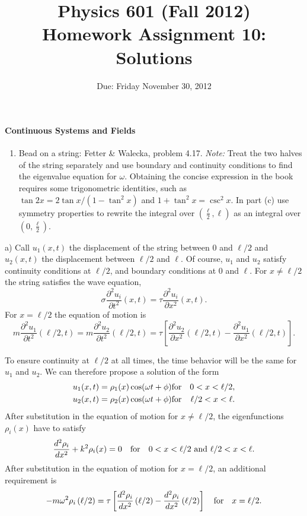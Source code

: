 \documentclass[letterpaper,11pt]{article}
\title{Physics 601 (Fall 2012) \\ Homework Assignment 10: Solutions}
\date{Due: Friday November 30, 2012}
\begin{document}
\maketitle

\paragraph*{Continuous Systems and Fields}
\begin{enumerate}[resume]
 \item Bead on a string: Fetter \& Walecka, problem 4.17. \emph{Note:} Treat the two halves of the string separately and use boundary and continuity conditions to find the eigenvalue equation for $\omega$.  Obtaining the concise expression in the book requires some trigonometric identities, such as $\tan 2x = 2 \tan x / (1-\tan^2 x)$ and $1 + \tan^2 x = \csc^2 x$.  In part (c) use symmetry properties to rewrite the integral over $(\frac{\ell}{2},\ell)$ as an integral over $(0,\frac{\ell}{2})$.
\end{enumerate}
a) Call $u_1(x,t)$ the displacement of the string between $0$ and $\ell/2$ and $u_2(x,t)$ the displacement between $\ell/2$ and $\ell$.  Of course, $u_1$ and $u_2$ satisfy continuity conditions at $\ell/2$, and boundary conditions at $0$ and $\ell$.  For $x \ne \ell/2$ the string satisfies the wave equation,
\begin{equation*}
 \sigma \frac{\partial^2 u_i}{\partial t^2}\left(x,t\right) = \tau \frac{\partial^2 u_i}{\partial x^2}\left(x,t\right).
\end{equation*}
For $x = \ell/2$ the equation of motion is
\begin{equation*}
 m \frac{\partial^2 u_1}{\partial t^2}\left(\ell/2,t\right) = m \frac{\partial^2 u_2}{\partial t^2}\left(\ell/2,t\right) = \tau \left[ \frac{\partial^2 u_2}{\partial x^2}\left(\ell/2,t\right) - \frac{\partial^2 u_1}{\partial x^2}\left(\ell/2,t\right) \right].
\end{equation*}

To ensure continuity at $\ell/2$ at all times, the time behavior will be the same for $u_1$ and $u_2$.  We can therefore propose a solution of the form
\begin{eqnarray*}
 u_1(x,t) = \rho_1(x) \cos(\omega t + \phi) & \hbox{for} & 0 < x < \ell/2, \\
 u_2(x,t) = \rho_2(x) \cos(\omega t + \phi) & \hbox{for} & \ell/2 < x < \ell.
\end{eqnarray*}
After substitution in the equation of motion for $x \ne \ell/2$, the eigenfunctions $\rho_i(x)$ have to satisfy
\begin{equation*}
 \frac{d^2 \rho_i}{d x^2} + k^2 \rho_i(x) = 0 \quad \hbox{for} \quad 0< x < \ell/2 ~ \hbox{and} ~ \ell/2 < x < \ell.
\end{equation*}
After substitution in the equation of motion for $x = \ell/2$, an additional requirement is
\begin{equation*}
 -m \omega^2 \rho_i\left(\ell/2\right) = \tau \left[ \frac{d^2 \rho_i}{d x^2}\left(\ell/2\right) - \frac{d^2 \rho_i}{d x^2}\left(\ell/2\right) \right] \quad \hbox{for} \quad x = \ell/2.
\end{equation*}
\end{document}
